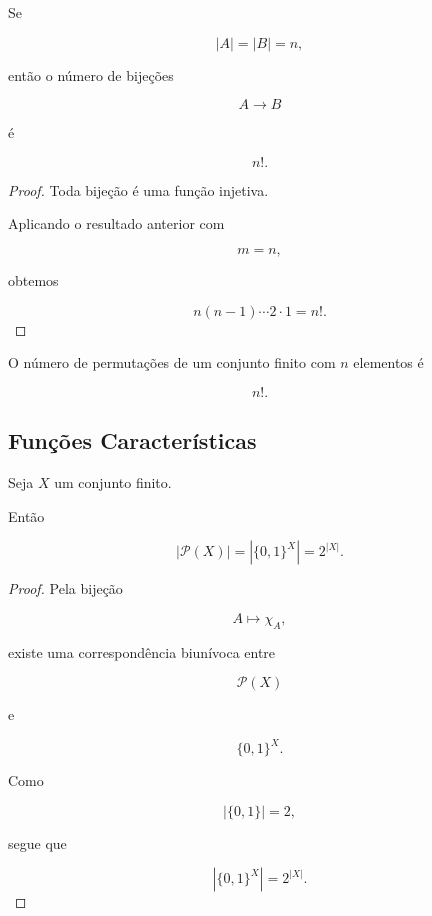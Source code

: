 \documentclass[../../main]{subfiles}
\begin{document}
\begin{prop}
	\label{prop:matematica:funcoes:cardinalidade:bijecoes}

	Se

	\[
		|A|
		=
		|B|
		=
		n,
	\]

	então o número de bijeções

	\[
		A\to B
	\]

	é

	\[
		n!.
	\]

\end{prop}

\begin{proof}

	Toda bijeção é uma função injetiva.

	Aplicando o resultado anterior com

	\[
		m=n,
	\]

	obtemos

	\[
		n(n-1)\cdots 2\cdot1
		=
		n!.
	\]

\end{proof}

\begin{cor}

	O número de permutações de um conjunto finito com \(n\) elementos é

	\[
		n!.
	\]

\end{cor}

\subsection{Funções Características}

\begin{prop}
	\label{prop:matematica:funcoes:cardinalidade:caracteristicas}

	Seja \(X\) um conjunto finito.

	Então

	\[
		|\mathcal P(X)|
		=
		|\{0,1\}^X|
		=
		2^{|X|}.
	\]

\end{prop}

\begin{proof}

	Pela bijeção

	\[
		A
		\mapsto
		\chi_A,
	\]

	existe uma correspondência biunívoca entre

	\[
		\mathcal P(X)
	\]

	e

	\[
		\{0,1\}^X.
	\]

	Como

	\[
		|\{0,1\}|
		=
		2,
	\]

	segue que

	\[
		|\{0,1\}^X|
		=
		2^{|X|}.
	\]

\end{proof}
\end{document}
